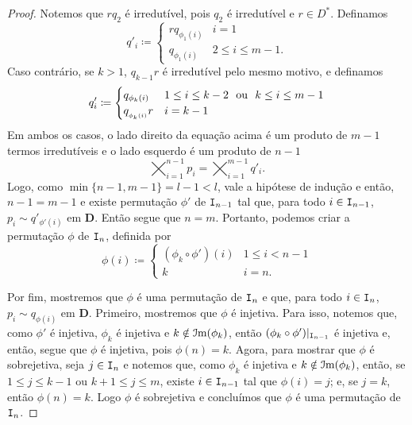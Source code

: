 \begin{proof}
	Notemos que $r q_2$ é irredutível, pois $q_2$ é irredutível e $r \in D^*$. Definamos
	\begin{equation*}
	q'_i \coloneqq
		\begin{cases}
		r q_{\phi_1(i)} 	& i=1 \\
		q_{\phi_1(i)} 	& 2 \leq i \leq m-1.
		\end{cases}
	\end{equation*}
Caso contrário, se $k>1$, $q_{k-1}r$ é irredutível pelo mesmo motivo, e definamos
	\begin{equation*}
	q'_i \coloneqq
		\begin{cases}
		q_{\phi_k(i)} 			& 1 \leq i \leq k-2 \ou k \leq i \leq m-1 \\
		q_{_{\phi_k(i)}}r 	& i = k-1
		\end{cases}
	\end{equation*}
Em ambos os casos, o lado direito da equação acima é um produto de $m-1$ termos irredutíveis e o lado esquerdo é um produto de $n-1$
	\begin{equation*}
	\bigtimes_{i=1}^{n-1} p_i = \bigtimes_{i=1}^{m-1} q'_i.
	\end{equation*}
Logo, como $\min\{n-1,m-1\}=l-1 < l$, vale a hipótese de indução e então, $n-1=m-1$ e existe permutação $\phi'$ de $\mathtt I_{n-1}$ tal que, para todo $i \in \mathtt I_{n-1}$, $p_i \sim q'_{\phi'(i)}$ em $\bm D$. Então segue que $n=m$. Portanto, podemos criar a permutação $\phi$ de $\mathtt I_n$, definida por
	\begin{equation*}
	\phi(i) \coloneqq
		\begin{cases}
		(\phi_k \circ \phi')(i) 	& 1 \leq i < n-1 \\
		k 								& i = n.
		\end{cases}
	\end{equation*}

	Por fim, mostremos que $\phi$ é uma permutação de $\mathtt I_n$ e que, para todo $i \in \mathtt I_n$, $p_i \sim q_{\phi(i)}$ em $\bm D$. Primeiro, mostremos que $\phi$ é injetiva. Para isso, notemos que, como $\phi'$ é injetiva, $\phi_k$ é injetiva e $k \notin\mathcal{I}\mathrm{m}(\phi_k)$, então $(\phi_k \circ \phi')|_{\mathtt I_{n-1}}$ é injetiva e, então, segue que $\phi$ é injetiva, pois $\phi(n)=k$. Agora, para mostrar que $\phi$ é sobrejetiva, seja $j \in \mathtt I_n$ e notemos que, como $\phi_k$ é injetiva e $k \notin \mathcal{I}\mathrm{m}(\phi_k)$, então, se $1 \leq j \leq k-1$ ou $k+1 \leq j \leq m$, existe $i \in \mathtt I_{n-1}$ tal que $\phi(i)=j$; e, se $j=k$, então $\phi(n)=k$. Logo $\phi$ é sobrejetiva e concluímos que $\phi$ é uma permutação de $\mathtt I_n$.


\end{proof}
